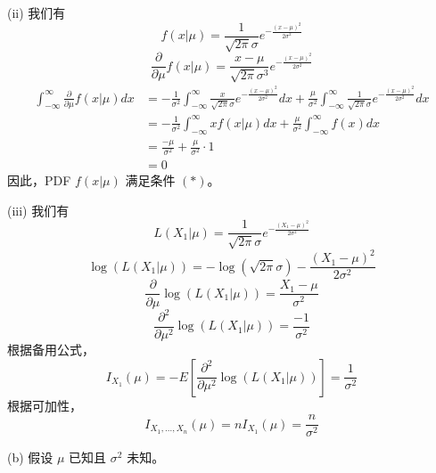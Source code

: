 \begin{questions}
\begin{solution}
(ii) 我们有
\[
f(x|\mu) = \frac{1}{\sqrt{2\pi}\sigma} e^{-\frac{(x-\mu)^2}{2\sigma^2}}
\]
\[
\frac{\partial}{\partial \mu} f(x|\mu) = \frac{x-\mu}{\sqrt{2\pi}\sigma^3} e^{-\frac{(x-\mu)^2}{2\sigma^2}}
\]
\begin{align*}
\int_{-\infty}^{\infty} \frac{\partial}{\partial \mu} f(x|\mu) dx &= -\frac{1}{\sigma^2} \int_{-\infty}^{\infty} \frac{x}{\sqrt{2\pi}\sigma} e^{-\frac{(x-\mu)^2}{2\sigma^2}} dx + \frac{\mu}{\sigma^2} \int_{-\infty}^{\infty} \frac{1}{\sqrt{2\pi}\sigma} e^{-\frac{(x-\mu)^2}{2\sigma^2}} dx \\
&= -\frac{1}{\sigma^2} \int_{-\infty}^{\infty} x f(x|\mu) dx + \frac{\mu}{\sigma^2} \int_{-\infty}^{\infty} f(x) dx \\
&= \frac{-\mu}{\sigma^2} + \frac{\mu}{\sigma^2} \cdot 1 \\
&= 0
\end{align*}
因此，PDF $f(x|\mu)$ 满足条件 $(*)$。

(iii) 我们有
\[
L(X_1|\mu) = \frac{1}{\sqrt{2\pi}\sigma} e^{-\frac{(X_1-\mu)^2}{2\sigma^2}}
\]
\[
\log(L(X_1|\mu)) = -\log(\sqrt{2\pi}\sigma) - \frac{(X_1-\mu)^2}{2\sigma^2}
\]
\[
\frac{\partial}{\partial \mu} \log(L(X_1|\mu)) = \frac{X_1-\mu}{\sigma^2}
\]
\[
\frac{\partial^2}{\partial \mu^2} \log(L(X_1|\mu)) = \frac{-1}{\sigma^2}
\]
根据备用公式，
\[
I_{X_1}(\mu) = -E\left[\frac{\partial^2}{\partial \mu^2} \log(L(X_1|\mu))\right] = \frac{1}{\sigma^2}
\]
根据可加性，
\[
I_{X_1, \dots, X_n}(\mu) = n I_{X_1}(\mu) = \frac{n}{\sigma^2}
\]

(b) 假设 $\mu$ 已知且 $\sigma^2$ 未知。


\end{solution}
\end{questions}

